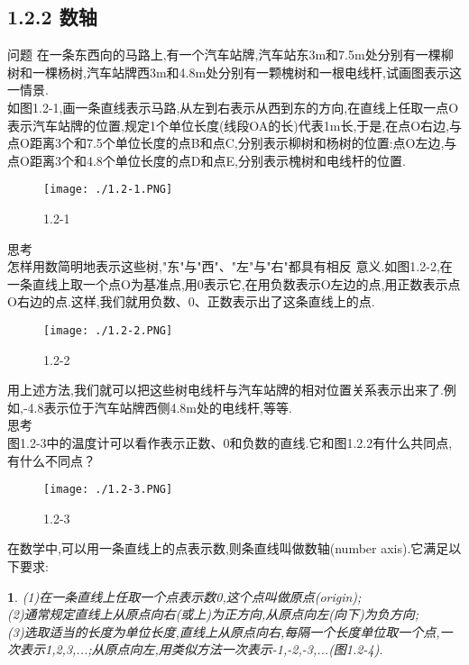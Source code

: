 \documentclass{article}
\newtheorem{propertory}{ }
\begin{document}
	\subsection*{1.2.2 数轴}
	问题 在一条东西向的马路上,有一个汽车站牌,汽车站东3m和7.5m处分别有一棵柳树和一棵杨树,汽车站牌西3m和4.8m处分别有一颗槐树和一根电线杆,试画图表示这一情景.\\
	\indent 如图1.2-1,画一条直线表示马路,从左到右表示从西到东的方向,在直线上任取一点O表示汽车站牌的位置,规定1个单位长度(线段OA的长)代表1m长,于是,在点O右边,与点O距离3个和7.5个单位长度的点B和点C,分别表示柳树和杨树的位置:点O左边,与点O距离3个和4.8个单位长度的点D和点E,分别表示槐树和电线杆的位置.\\
	\begin{figure}[ht!]
		\centering
		\texttt{[image: ./1.2-1.PNG]}
		\caption{1.2-1}
	\end{figure}

	思考\\
	\indent 怎样用数简明地表示这些树,"东"与"西"、"左"与"右"都具有相反 意义.如图1.2-2,在一条直线上取一个点O为基准点,用0表示它,在用负数表示O左边的点,用正数表示点O右边的点.这样,我们就用负数、0、正数表示出了这条直线上的点.\\
	\begin{figure}[ht!]
		\centering
		\texttt{[image: ./1.2-2.PNG]}
		\caption{1.2-2}
	\end{figure}
	\indent 用上述方法,我们就可以把这些树电线杆与汽车站牌的相对位置关系表示出来了.例如,-4.8表示位于汽车站牌西侧4.8m处的电线杆,等等.\\
	
	思考\\
	\indent 图1.2-3中的温度计可以看作表示正数、0和负数的直线.它和图1.2.2有什么共同点,有什么不同点？
	\begin{figure}[ht!]
		\centering
		\texttt{[image: ./1.2-3.PNG]}
		\caption{1.2-3}
	\end{figure}

	\begin{defintion}
		在数学中,可以用一条直线上的点表示数,则条直线叫做数轴(number axis).它满足以下要求:\\
	\end{defintion}
	
	\begin{propertory}
		\indent (1)在一条直线上任取一个点表示数0,这个点叫做原点(origin);\\
		\indent (2)通常规定直线上从原点向右(或上)为正方向,从原点向左(向下)为负方向;\\
		\indent (3)选取适当的长度为单位长度,直线上从原点向右,每隔一个长度单位取一个点,一次表示1,2,3,...;从原点向左,用类似方法一次表示-1,-2,-3,...(图1.2-4).\\
	\end{propertory}
	
\end{document}
